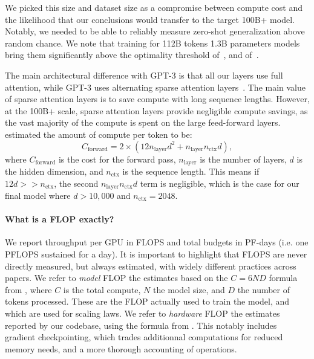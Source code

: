 We picked this size and dataset size as a compromise between compute cost and the likelihood that our conclusions would transfer to the target 100B+ model. Notably, we needed to be able to reliably measure zero-shot generalization above random chance. We note that training for 112B tokens 1.3B parameters models bring them significantly above the optimality threshold of~\citet{kaplan2020scaling}, and of~\citet{hoffmann2022training}. 


The main architectural difference with GPT-3 is that all our layers use full attention, while GPT-3 uses alternating sparse attention layers~\citep{sparse}. 
The main value of sparse attention layers is to save compute with long sequence lengths. However, at the 100B+ scale, sparse attention layers
provide negligible compute savings, as the vast majority of the compute is spent on the large feed-forward layers.
\citet{kaplan2020scaling} estimated the amount of compute per token to be:
\begin{equation*}
C_\text{forward} = 2 \times (12 n_\text{layer} d^2 + n_\text{layer} n_\text{ctx} d),
\end{equation*}
where $C_\text{forward}$ is the cost for the forward pass, $n_\text{layer}$ is the number of layers, $d$ is the hidden dimension, and $n_\text{ctx}$ is the sequence length. This means if $12 d >> n_\text{ctx}$, the 
second $n_\text{layer} n_\text{ctx} d$ term is negligible, which is the case for our final model 
where $d > 10,000$ and $n_\text{ctx} = 2048$. 

\paragraph{What is a FLOP exactly?} We report throughput per GPU in FLOPS and total budgets in PF-days (i.e. one PFLOPS sustained for a day). It is important to highlight that FLOPS are never directly measured, but always estimated, with widely different practices across papers. We refer to \emph{model} FLOP the estimates based on the $C=6ND$ formula from \citet{kaplan2020scaling}, where $C$ is the total compute, $N$ the model size, and $D$ the number of tokens processed. These are the FLOP actually used to train the model, and which are used for scaling laws. We refer to \emph{hardware} FLOP the estimates reported by our codebase, using the formula from \citet{narayanan2021efficient}. This notably includes gradient checkpointing, which trades additionnal computations for reduced memory needs, and a more thorough accounting of operations.

